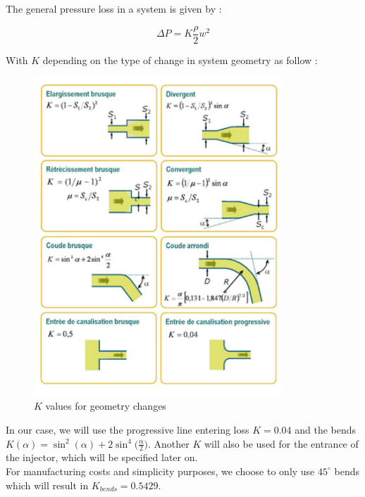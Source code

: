 The general pressure loss in a system is given by :

$$
\Delta P = K\frac \rho 2 w^2
$$

With $K$ depending on the type of change in system geometry as follow : 
\begin{figure}[H]
	\centering
	\includegraphics[height=12cm]{pertecharge}
	\caption{$K$ values for geometry changes}
\end{figure}
In our case, we will use the progressive line entering loss $K = 0.04$ and the bends $ K(\alpha) = \sin^2(\alpha) + 2\sin^4\bigg(\frac\alpha 2\bigg)$. Another $K$ will also be used for the entrance of the injector, which will be specified later on.\\

For manufacturing costs and simplicity purposes, we choose to only use $45^\circ$ bends which will result in $K_{bends}=0.5429$.\\

